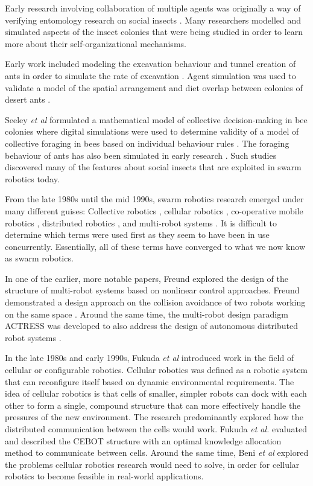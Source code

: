 Early research involving collaboration of multiple agents was originally a way of verifying entomology research on social insects \cite{dorigo2014swarm, beni1993swarm, seeley2009wisdom}. Many researchers modelled and simulated aspects of the insect colonies that were being studied in order to learn more about their self-organizational mechanisms. 

Early work included modeling the excavation behaviour and tunnel creation of ants in order to simulate the rate of excavation \cite{sudd1975model}. Agent simulation was used to validate a model of the spatial arrangement and diet overlap between colonies of desert ants \cite{ryti1984spatial}.

Seeley \textit{et al }\cite{seeley1991collective} formulated a mathematical model of collective decision-making in bee colonies where digital simulations were used to determine validity of a model of collective foraging in bees based on individual behaviour rules \cite{de1998modelling}. The foraging behaviour of ants has also been simulated in early research \cite{lopez1987optimal}. Such studies discovered many of the features about social insects that are exploited in swarm robotics today.

From the late 1980s until the mid 1990s, swarm robotics research emerged under many different guises: Collective robotics \cite{kube1993collective}, cellular robotics \cite{freund1984design}, co-operative mobile robotics \cite{cao1997cooperative}, distributed robotics \cite{asama2013distributed}, and multi-robot systems \cite{mataric1995cooperative}. It is difficult to determine which terms were used first as they seem to have been in use concurrently. Essentially, all of these terms have converged to what we now know as swarm robotics.

In one of the earlier, more notable papers, Freund explored the design of the structure of multi-robot systems based on nonlinear control approaches. Freund demonstrated a design approach on the collision avoidance of two robots working on the same space \cite{freund1984design,freund1986pathfinding}. Around the same time, the multi-robot design paradigm ACTRESS was developed to also address the design of autonomous distributed robot systems \cite{asama1989design}. 

In the late 1980s and early 1990s, Fukuda \textit{et al} \cite{fukuda1989communication, fukuda1990analysis} introduced work in the field of cellular or configurable robotics. Cellular robotics was defined as a robotic system that can reconfigure itself based on dynamic environmental requirements. The idea of cellular robotics is that cells of smaller, simpler robots can dock with each other to form a single, compound structure that can more effectively handle the pressures of the new environment. The research predominantly explored how the distributed communication between the cells would work. Fukuda \textit{et al.} evaluated and described the CEBOT structure with an optimal knowledge allocation method to communicate between cells. Around the same time, Beni \textit{et al} \cite{beni1991theoretical} explored the problems cellular robotics research would need to solve, in order for cellular robotics to become feasible in real-world applications.


